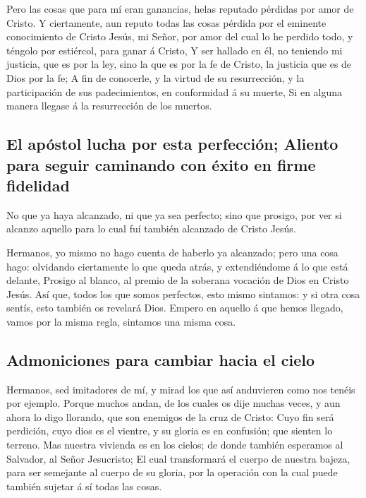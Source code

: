  Pero las cosas que para mí eran ganancias, helas reputado
pérdidas por amor de Cristo.  Y ciertamente, aun reputo
todas las cosas pérdida por el eminente conocimiento de Cristo Jesús, mi
Señor, por amor del cual lo he perdido todo, y téngolo por estiércol,
para ganar á Cristo,  Y ser hallado en él, no teniendo mi
justicia, que es por la ley, sino la que es por la fe de Cristo, la
justicia que es de Dios por la fe;  A fin de conocerle, y
la virtud de su resurrección, y la participación de sus padecimientos,
en conformidad á su muerte,  Si en alguna manera llegase á
la resurrección de los muertos.

\hypertarget{el-apuxf3stol-lucha-por-esta-perfecciuxf3n-aliento-para-seguir-caminando-con-uxe9xito-en-firme-fidelidad}{%
\subsection{El apóstol lucha por esta perfección; Aliento para seguir
caminando con éxito en firme
fidelidad}\label{el-apuxf3stol-lucha-por-esta-perfecciuxf3n-aliento-para-seguir-caminando-con-uxe9xito-en-firme-fidelidad}}

 No que ya haya alcanzado, ni que ya sea perfecto; sino que
prosigo, por ver si alcanzo aquello para lo cual fuí también alcanzado
de Cristo Jesús.

 Hermanos, yo mismo no hago cuenta de haberlo ya alcanzado;
pero una cosa hago: olvidando ciertamente lo que queda atrás, y
extendiéndome á lo que está delante,  Prosigo al blanco, al
premio de la soberana vocación de Dios en Cristo Jesús. 
Así que, todos los que somos perfectos, esto mismo sintamos: y si otra
cosa sentís, esto también os revelará Dios.  Empero en
aquello á que hemos llegado, vamos por la misma regla, sintamos una
misma cosa.

\hypertarget{admoniciones-para-cambiar-hacia-el-cielo}{%
\subsection{Admoniciones para cambiar hacia el
cielo}\label{admoniciones-para-cambiar-hacia-el-cielo}}

 Hermanos, sed imitadores de mí, y mirad los que así
anduvieren como nos tenéis por ejemplo.  Porque muchos
andan, de los cuales os dije muchas veces, y aun ahora lo digo llorando,
que son enemigos de la cruz de Cristo:  Cuyo fin será
perdición, cuyo dios es el vientre, y su gloria es en confusión; que
sienten lo terreno.  Mas nuestra vivienda es en los cielos;
de donde también esperamos al Salvador, al Señor Jesucristo;
 El cual transformará el cuerpo de nuestra bajeza, para ser
semejante al cuerpo de su gloria, por la operación con la cual puede
también sujetar á sí todas las cosas.

